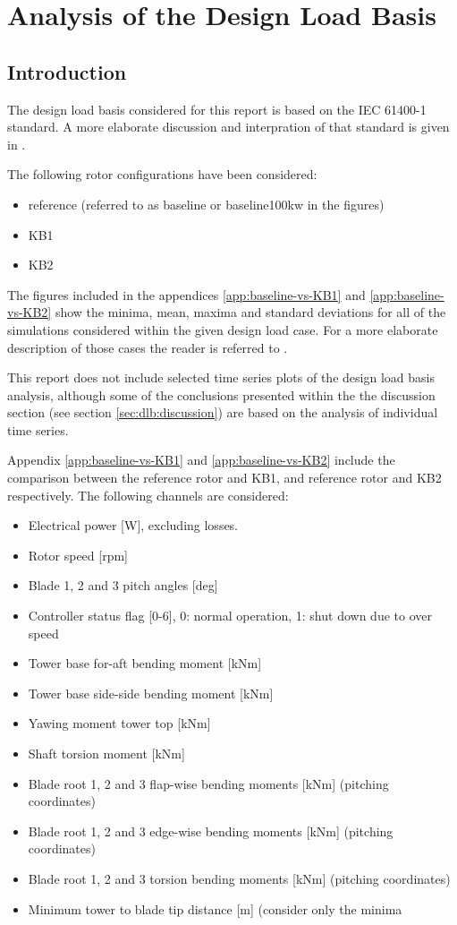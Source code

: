 \chapter{Analysis of the Design Load Basis}

\section{Introduction}

The design load basis considered for this report is based on the IEC 61400-1 standard. A more elaborate discussion and interpration of that standard is given in \cite{hansen_design_2015}.

The following rotor configurations have been considered:
\begin{itemize}
	\item reference (referred to as baseline or baseline100kw in the figures)
	\item KB1
	\item KB2
\end{itemize}

The figures included in the appendices \ref{app:baseline-vs-KB1} and \ref{app:baseline-vs-KB2} show the minima, mean, maxima and standard deviations for all of the simulations considered within the given design load case. For a more elaborate description of those cases the reader is referred to \cite{hansen_design_2015}.

This report does not include selected time series plots of the design load basis analysis, although some of the conclusions presented within the the discussion section (see section \ref{sec:dlb:discussion}) are based on the analysis of individual time series.

Appendix \ref{app:baseline-vs-KB1} and \ref{app:baseline-vs-KB2} include the comparison between the reference rotor and KB1, and reference rotor and KB2 respectively. The following channels are considered:
\begin{itemize}
	\item Electrical power [W], excluding losses.
    \item Rotor speed [rpm]
    \item Blade 1, 2 and 3 pitch angles [deg]
    \item Controller status flag [0-6], 0: normal operation, 1: shut down due to over speed
    \item Tower base for-aft bending moment [kNm]
    \item Tower base side-side bending moment [kNm]
    \item Yawing moment tower top [kNm]
    \item Shaft torsion moment [kNm]
    \item Blade root 1, 2 and 3 flap-wise bending moments [kNm] (pitching coordinates)
    \item Blade root 1, 2 and 3 edge-wise bending moments [kNm] (pitching coordinates)
    \item Blade root 1, 2 and 3 torsion bending moments [kNm] (pitching coordinates)
    \item Minimum tower to blade tip distance [m] (consider only the minima
\end{itemize}


